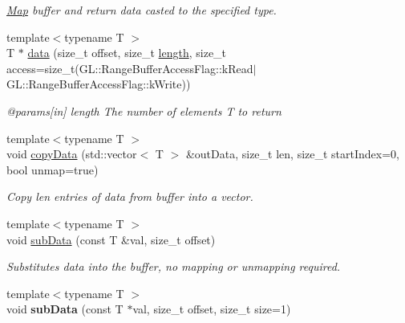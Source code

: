 \begin{Indent}
\begin{DoxyCompactItemize}
\begin{DoxyCompactList}\small\item\em \mbox{\hyperlink{classrev_1_1_map}{Map}} buffer and return data casted to the specified type. \end{DoxyCompactList}\item 
\mbox{\label{classrev_1_1_g_l_buffer_a5700d3ca77630aaa3da5d37c68a9c34b}} 
{\footnotesize template$<$typename T $>$ }\\T $\ast$ \mbox{\hyperlink{classrev_1_1_g_l_buffer_a5700d3ca77630aaa3da5d37c68a9c34b}{data}} (size\+\_\+t offset, size\+\_\+t \mbox{\hyperlink{classrev_1_1_g_l_buffer_a15e3457786a2c14008a8b14b12a82c03}{length}}, size\+\_\+t access=size\+\_\+t(G\+L\+::\+Range\+Buffer\+Access\+Flag\+::k\+Read$\vert$G\+L\+::\+Range\+Buffer\+Access\+Flag\+::k\+Write))
\begin{DoxyCompactList}\small\item\em @params\mbox{[}in\mbox{]} length The number of elements T to return \end{DoxyCompactList}\item 
\mbox{\label{classrev_1_1_g_l_buffer_a254528e7cbf6268e516511f9266c8c45}} 
{\footnotesize template$<$typename T $>$ }\\void \mbox{\hyperlink{classrev_1_1_g_l_buffer_a254528e7cbf6268e516511f9266c8c45}{copy\+Data}} (std\+::vector$<$ T $>$ \&out\+Data, size\+\_\+t len, size\+\_\+t start\+Index=0, bool unmap=true)
\begin{DoxyCompactList}\small\item\em Copy len entries of data from buffer into a vector. \end{DoxyCompactList}\item 
{\footnotesize template$<$typename T $>$ }\\void \mbox{\hyperlink{classrev_1_1_g_l_buffer_a92d217358a53b80cf8b2ed9385f30faf}{sub\+Data}} (const T \&val, size\+\_\+t offset)
\begin{DoxyCompactList}\small\item\em Substitutes data into the buffer, no mapping or unmapping required. \end{DoxyCompactList}\item 
\mbox{\label{classrev_1_1_g_l_buffer_a89e7255d32f69c002e30a3b196fcbf6b}} 
{\footnotesize template$<$typename T $>$ }\\void {\bfseries sub\+Data} (const T $\ast$val, size\+\_\+t offset, size\+\_\+t size=1)

\end{DoxyCompactItemize}
\end{Indent}
